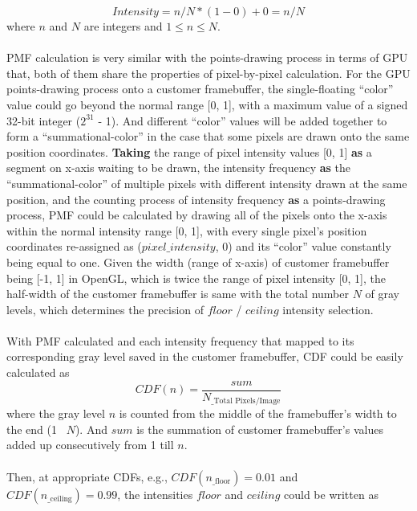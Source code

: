 \begin{equation}
%
Intensity = n/N * (1 - 0) + 0 = n/N
%
\end{equation}%
%
where \(n\) and \(N\) are integers and \(1 \leqslant n \leqslant N\).\\\\%
%
PMF calculation is very similar with the points-drawing process in terms of GPU that, both of them share the properties of pixel-by-pixel calculation. For the GPU points-drawing process onto a customer framebuffer, the single-floating \enquote{color} value could go beyond the normal range [0, 1], with a maximum value of a signed 32-bit integer (\(2^{31}\) - 1). And different \enquote{color} values will be added together to form a \enquote{summational-color} in the case that some pixels are drawn onto the same position coordinates. \textbf{Taking} the range of pixel intensity values [0, 1] \textbf{as} a segment on x-axis waiting to be drawn, the intensity frequency \textbf{as} the \enquote{summational-color} of multiple pixels with different intensity drawn at the same position, and the counting process of intensity frequency \textbf{as} a points-drawing process, PMF could be calculated by drawing all of the pixels onto the x-axis within the normal intensity range [0, 1], with every single pixel's position coordinates re-assigned as (\(pixel\_intensity\), \(0\)) and its \enquote{color} value constantly being equal to one. Given the width (range of x-axis) of customer framebuffer being [-1, 1] in OpenGL, which is twice the range of pixel intensity [0, 1], the half-width of the customer framebuffer is same with the total number \(N\) of gray levels, which determines the precision of \(floor\) / \(ceiling\) intensity selection. 
\\\\%
With PMF calculated and each intensity frequency that mapped to its corresponding gray level saved in the customer framebuffer, CDF could be easily calculated as
%
\begin{equation}
%
CDF(n) = \frac{sum}{N_{\text{\_Total Pixels/Image}}} 
%
\end{equation}%
%
where the gray level \(n\) is counted from the middle of the framebuffer's width to the end (1 \texttildelow \, \(N\)). And \(sum\) is the summation of customer framebuffer's values added up consecutively from 1 till \(n\).\\\\%
%
Then, at appropriate CDFs, e.g., \(CDF(n_{\text{\_floor}}) = 0.01\) and \(CDF(n_{\text{\_ceiling}}) = 0.99\), the intensities \(floor\) and \(ceiling\) could be written as
